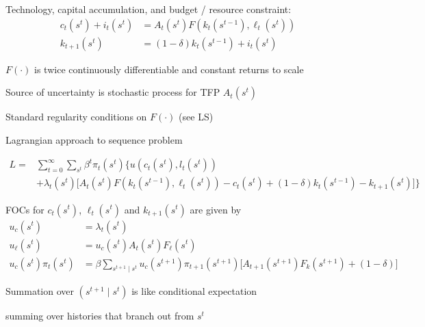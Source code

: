 \documentclass[11pt, aspectratio=169]{beamer}
\newenvironment{witemize}{\itemize\addtolength{\itemsep}{10pt}}{\enditemize}
\begin{document}
\begin{frame}{}
\begin{witemize}
\item Technology, capital accumulation, and budget / resource constraint:
\begin{align*}
	c_t(s^t) + i_t(s^t) &= A_t(s^t) F(k_t(s^{t-1}), \ell_t(s^t)) \\
	k_{t+1}(s^t) &= (1-\delta) k_t(s^{t-1}) + i_t(s^t)
\end{align*}

\item $F(\cdot)$ is twice continuously differentiable and constant returns to scale

\item Source of uncertainty is stochastic process for TFP $A_t(s^t)$

\item Standard regularity conditions on $F(\cdot)$ (see LS)
\end{witemize}
\end{frame}


\begin{frame}{Lagrangian approach to sequence problem}

\begin{align*}
	L = &\sum_{t=0}^\infty \sum_{s^t} \beta^t \pi_t(s^t) \bigg\{ u (c_t(s^t), l_t(s^t)) \\
	&+ \lambda_t(s^t) \bigg[ A_t(s^t) F(k_t(s^{t-1}), \ell_t(s^t)) - c_t(s^t) + (1-\delta) k_t(s^{t-1})  - k_{t+1}(s^t) \bigg] \bigg\}
\end{align*}

\begin{witemize}
\item FOCs for $c_t(s^t)$, $\ell_t(s^t)$ and $k_{t+1}(s^t)$ are given by
\begin{align*}
	u_c(s^t) &= \lambda_t(s^t) \\
	u_\ell(s^t) &= u_c(s^t) A_t(s^t) F_\ell(s^t) \\
	u_c(s^t) \pi_t(s^t) &= \beta \sum_{s^{t+1} \mid s^t} u_c(s^{t+1}) \pi_{t+1}(s^{t+1}) \bigg[ A_{t+1} (s^{t+1}) F_k (s^{t+1}) + (1-\delta) \bigg]
\end{align*}

\item Summation over $(s^{t+1} \mid s^t)$ is like conditional expectation 

	{\footnotesize summing over histories that branch out from $s^t$}

\end{witemize}
\end{frame}
\end{document}
